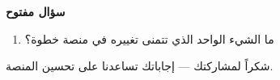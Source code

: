 ﻿\documentclass[12pt]{article}
\begin{document}
\vspace{0.8em}
{\Large\bfseries سؤال مفتوح}

\begin{enumerate}[start=12]
  \item ما الشيء الواحد الذي تتمنى تغييره في منصة خطوة؟
\end{enumerate}

\noindent\colorbox{boxgray}{\parbox{\dimexpr\linewidth-2\fboxsep}{
  \vspace{3.5em}\hfill\vspace{3.5em}
}}

\vspace{1em}
\begin{center}
  {\small شكراً لمشاركتك --- إجاباتك تساعدنا على تحسين المنصة.}
\end{center}
\end{document}
